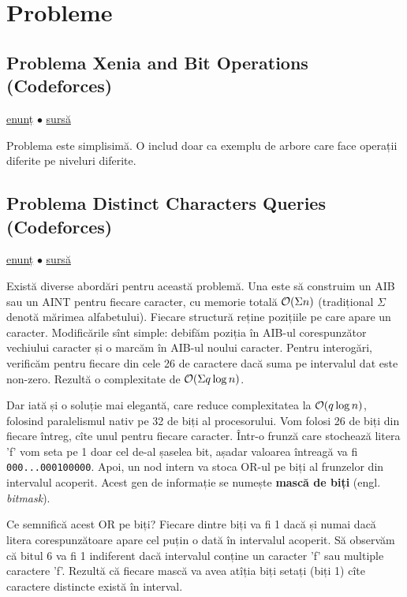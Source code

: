 \documentclass[../main.tex]{subfiles}
\begin{document}
\section{Probleme}

\subsection{Problema Xenia and Bit Operations (Codeforces)}
\label{problem:xenia-and-bit-operations}

\href{https://codeforces.com/contest/339/problem/D}{enunț}
$\bullet$
\hyperref[code:xenia-and-bit-operations]{sursă}

Problema este simplisimă. O includ doar ca exemplu de arbore care face operații diferite pe niveluri diferite.

\subsection{Problema Distinct Characters Queries (Codeforces)}
\label{problem:distinct-characters-queries}

\href{https://codeforces.com/contest/1234/problem/D}{enunț}
$\bullet$
\hyperref[code:distinct-characters-queries]{sursă}

Există diverse abordări pentru această problemă. Una este să construim un AIB sau un AINT pentru fiecare caracter, cu memorie totală $\mathcal{O}(\Sigma n)$ (tradițional $\Sigma$ denotă mărimea alfabetului). Fiecare structură reține pozițiile pe care apare un caracter. Modificările sînt simple: debifăm poziția în AIB-ul corespunzător vechiului caracter și o marcăm în AIB-ul noului caracter. Pentru interogări, verificăm pentru fiecare din cele 26 de caractere dacă suma pe intervalul dat este non-zero. Rezultă o complexitate de $\mathcal{O}(\Sigma q \log n)$.

Dar iată și o soluție mai elegantă, care reduce complexitatea la $\mathcal{O}(q \log n)$, folosind paralelismul nativ pe 32 de biți al procesorului. Vom folosi 26 de biți din fiecare întreg, cîte unul pentru fiecare caracter. Într-o frunză care stochează litera 'f' vom seta pe 1 doar cel de-al șaselea bit, așadar valoarea întreagă va fi \texttt{000...000100000}. Apoi, un nod intern va stoca OR-ul pe biți al frunzelor din intervalul acoperit. Acest gen de informație se numește \textbf{mască de biți} (engl. \textit{bitmask}).

Ce semnifică acest OR pe biți? Fiecare dintre biți va fi 1 dacă și numai dacă litera corespunzătoare apare cel puțin o dată în intervalul acoperit. Să observăm că bitul 6 va fi 1 indiferent dacă intervalul conține un caracter 'f' sau multiple caractere 'f'. Rezultă că fiecare mască va avea atîția biți setați (biți 1) cîte caractere distincte există în interval.
\end{document}
